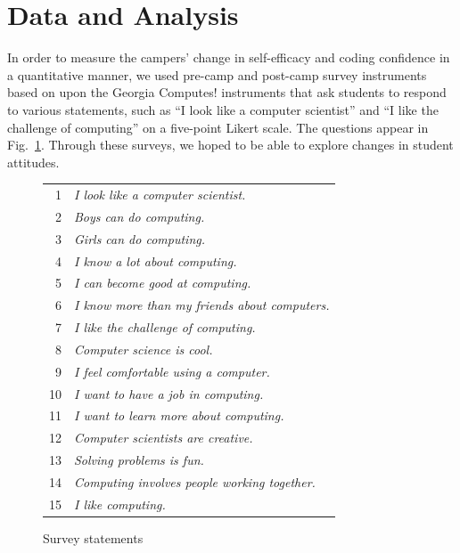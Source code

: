 \section{Data and Analysis}

In order to measure the campers' change in self-efficacy and coding
confidence in a quantitative manner, we used pre-camp and post-camp
survey instruments based on upon the Georgia Computes! instruments
\cite{Bruckman2009} that ask students to respond to various statements,
such as ``I look like a computer scientist'' and ``I like the
challenge of computing'' on a five-point Likert scale.  The questions
appear in Fig.~\ref{figure:survey}.  Through these surveys, we hoped
to be able to explore changes in student attitudes.  

\begin{figure}
{\small
\begin{tabular}{rl}
1 & \textit{I look like a computer scientist.} \\
2 & \textit{Boys can do computing.} \\
3 & \textit{Girls can do computing.} \\
4 & \textit{I know a lot about computing.} \\
5 & \textit{I can become good at computing.} \\
6 & \textit{I know more than my friends about computers.} \\
7 & \textit{I like the challenge of computing.} \\
8 & \textit{Computer science is cool.} \\
9 & \textit{I feel comfortable using a computer.} \\
10 & \textit{I want to have a job in computing.} \\
11 & \textit{I want to learn more about computing.} \\
12 & \textit{Computer scientists are creative.} \\
13 & \textit{Solving problems is fun.} \\
14 & \textit{Computing involves people working together.} \\
15 & \textit{I like computing.} 
\end{tabular}
}
\label{figure:survey}
\caption{Survey statements}
\end{figure}

